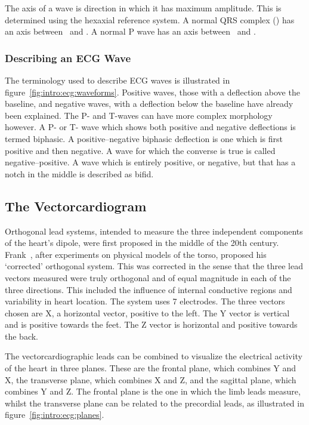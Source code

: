 The axis of a wave is direction in which it has maximum amplitude.
This is determined using the hexaxial reference system.
A normal QRS complex (\cite{Lipman1994,Katz2006}) has an axis between \
and .
A normal P wave has an axis between \ and .

\subsubsection{Describing an ECG Wave}

The terminology used to describe ECG waves is illustrated in
figure~\ref{fig:intro:ecg:waveforms}.
Positive waves, those with a deflection above the baseline, and negative waves,
with a deflection below the baseline have already been explained.
The P- and T-waves can have more complex morphology however.
A P- or T- wave which shows both positive and negative deflections is termed
biphasic.
A positive--negative biphasic deflection is one which is first positive and then
negative.
A wave for which the converse is true is called negative--positive.
A wave which is entirely positive, or negative, but that has a notch in the
middle is described as bifid.

\subsection{The Vectorcardiogram}

Orthogonal lead systems, intended to measure the three independent components of
the heart's dipole, were first proposed in the middle of the 20th century.
Frank~\cite{Frank1956}, after experiments on physical models of the torso,
proposed his `corrected' orthogonal system.
This was corrected in the sense that the three lead vectors measured were
truly orthogonal and of equal magnitude in each of the three directions.
This included the influence of internal conductive regions and variability in
heart location.
The system uses 7 electrodes.
The three vectors chosen are X, a horizontal vector, positive to the left.
The Y vector is vertical and is positive towards the feet.
The Z vector is horizontal and positive towards the back.

The vectorcardiographic leads can be combined to visualize the electrical
activity of the heart in three planes.
These are the frontal plane, which combines Y and X, the transverse plane, which
combines X and Z, and the sagittal plane, which combines Y and Z.
The frontal plane is the one in which the limb leads measure, whilst the transverse plane
can be related to the precordial leads, as illustrated in
figure~\ref{fig:intro:ecg:planes}.

